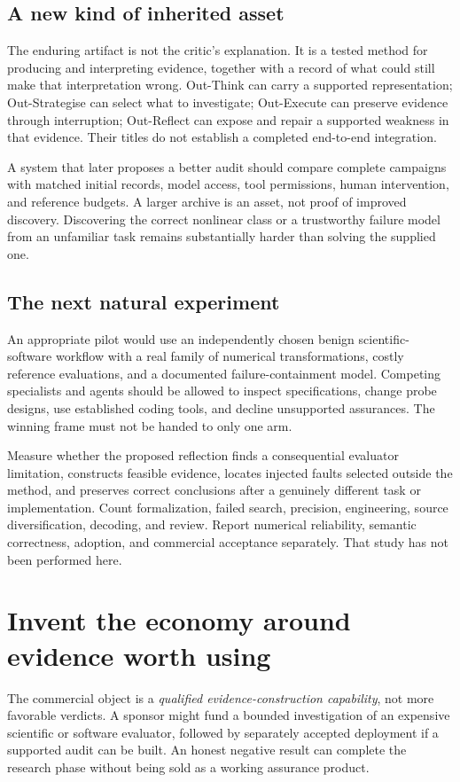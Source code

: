 \documentclass[11pt,letterpaper]{article}
\theoremstyle{remark}\newtheorem{remark}{Remark}[section]
\begin{document}
\subsection{A new kind of inherited asset}
The enduring artifact is not the critic's explanation. It is a tested method for producing and interpreting evidence, together with a record of what could still make that interpretation wrong. Out-Think can carry a supported representation; Out-Strategise can select what to investigate; Out-Execute can preserve evidence through interruption; Out-Reflect can expose and repair a supported weakness in that evidence. Their titles do not establish a completed end-to-end integration.

A system that later proposes a better audit should compare complete campaigns with matched initial records, model access, tool permissions, human intervention, and reference budgets. A larger archive is an asset, not proof of improved discovery. Discovering the correct nonlinear class or a trustworthy failure model from an unfamiliar task remains substantially harder than solving the supplied one.

\subsection{The next natural experiment}
An appropriate pilot would use an independently chosen benign scientific-software workflow with a real family of numerical transformations, costly reference evaluations, and a documented failure-containment model. Competing specialists and agents should be allowed to inspect specifications, change probe designs, use established coding tools, and decline unsupported assurances. The winning frame must not be handed to only one arm.

Measure whether the proposed reflection finds a consequential evaluator limitation, constructs feasible evidence, locates injected faults selected outside the method, and preserves correct conclusions after a genuinely different task or implementation. Count formalization, failed search, precision, engineering, source diversification, decoding, and review. Report numerical reliability, semantic correctness, adoption, and commercial acceptance separately. That study has not been performed here.

\section{Invent the economy around evidence worth using}
\label{sec:economy}
The commercial object is a \emph{qualified evidence-construction capability}, not more favorable verdicts. A sponsor might fund a bounded investigation of an expensive scientific or software evaluator, followed by separately accepted deployment if a supported audit can be built. An honest negative result can complete the research phase without being sold as a working assurance product.
\end{document}
